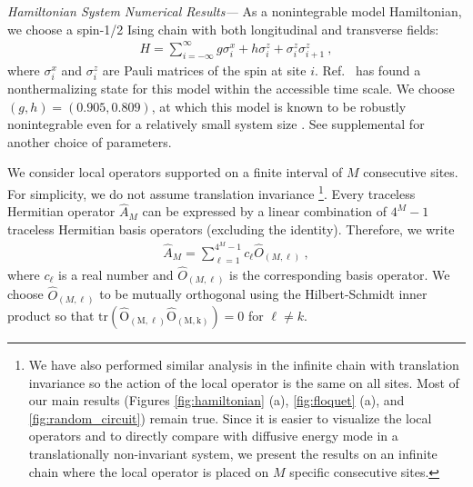 \documentclass[twocolumn,superscriptaddress, prl,showpacs]{revtex4-1}
\begin{document}
{\it Hamiltonian System Numerical Results---}
As a nonintegrable model Hamiltonian, we choose a spin-1/2 Ising chain with both longitudinal and transverse fields:
\begin{align}
H = \sum_{i = -\infty}^{\infty} g\sigma^x_i + h\sigma^z_i + \sigma^z_i \sigma^z_{i+1} ~,
\label{eq:Hamiltonian}
\end{align}
where $\sigma^x_i$ and $\sigma^z_i$ are Pauli matrices of the spin at site $i$.
Ref.~ has found a nonthermalizing state for this model within the accessible time scale.
We choose $(g,h) = (0.905, 0.809)$, at which this model is known to be robustly nonintegrable even for a relatively small system size \cite{Kim:2013}.
See supplemental for another choice of parameters.

We consider local operators supported on a finite interval of $M$ consecutive sites.
For simplicity, we do not assume translation invariance
\footnote{We have also performed similar analysis in the infinite chain with translation invariance so the action of the local operator is the same on all sites. Most of our main results (Figures \ref{fig:hamiltonian} (a), \ref{fig:floquet} (a), and \ref{fig:random_circuit})
remain true. Since it is easier to visualize the local operators and to directly compare with diffusive energy mode in a translationally non-invariant system, we present the results on an infinite chain where the local operator is placed on $M$ specific consecutive sites.}.
Every traceless Hermitian operator
$\hat{A}_M$ can be expressed by a linear combination of $4^M - 1$ traceless Hermitian basis operators (excluding the identity).
Therefore, we write
\begin{align}
\hat{A}_M = \sum_{\ell = 1}^{4^M - 1} c_\ell \hat{O}_{(M,\ell)} ~,
\end{align}
where $c_\ell$ is a real number and $\hat{O}_{(M,\ell)}$ is the corresponding basis operator.
We choose $\hat{O}_{(M,\ell)}$ to be mutually orthogonal using the Hilbert-Schmidt inner product so that
$\mathrm{tr(\hat{O}_{(M,\ell)} \hat{O}_{(M,k)})} = 0$ for $\ell\neq k$.
\end{document}
